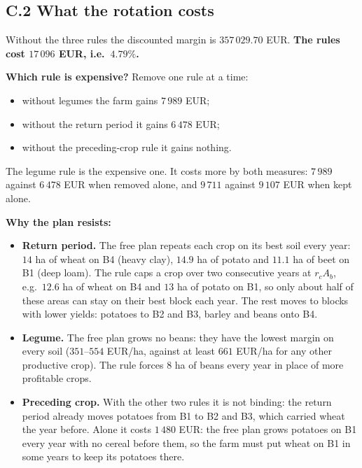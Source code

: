 \subsection*{C.2 \quad What the rotation costs}

Without the three rules the discounted margin is $357\,029.70$ EUR. \textbf{The rules cost $17\,096$ EUR, i.e.\ $4.79\%$.}




\textbf{Which rule is expensive?} Remove one rule at a time:
\begin{itemize}
\item without legumes the farm gains $7\,989$ EUR;
\item without the return period it gains $6\,478$ EUR;
\item without the preceding-crop rule it gains nothing.
\end{itemize}
The legume rule is the expensive one. It costs more by both measures: $7\,989$ against $6\,478$ EUR when removed alone, and $9\,711$ against $9\,107$ EUR when kept alone.

\textbf{Why the plan resists:}
\begin{itemize}
\item \textbf{Return period.} The free plan repeats each crop on its best soil every year: $14$ ha of wheat on B4 (heavy clay), $14.9$ ha of potato and $11.1$ ha of beet on B1 (deep loam). The rule caps a crop over two consecutive years at $r_cA_b$, e.g.\ $12.6$ ha of wheat on B4 and $13$ ha of potato on B1, so only about half of these areas can stay on their best block each year. The rest moves to blocks with lower yields: potatoes to B2 and B3, barley and beans onto B4.
\item \textbf{Legume.} The free plan grows no beans: they have the lowest margin on every soil ($351$--$554$ EUR/ha, against at least $661$ EUR/ha for any other productive crop). The rule forces $8$ ha of beans every year in place of more profitable crops.
\item \textbf{Preceding crop.} With the other two rules it is not binding: the return period already moves potatoes from B1 to B2 and B3, which carried wheat the year before. Alone it costs $1\,480$ EUR: the free plan grows potatoes on B1 every year with no cereal before them, so the farm must put wheat on B1 in some years to keep its potatoes there.
\end{itemize}

